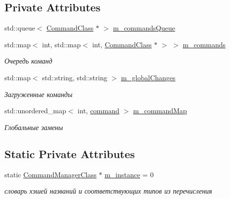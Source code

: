 \subsection*{Private Attributes}
\begin{DoxyCompactItemize}
\item 
std\+::queue$<$ \hyperlink{class_command_class}{Command\+Class} $\ast$ $>$ \hyperlink{class_command_manager_class_ac1a66744c16609dbcd5171adb72049ae}{m\+\_\+commands\+Queue}
\item 
std\+::map$<$ int, std\+::map$<$ int, \hyperlink{class_command_class}{Command\+Class} $\ast$ $>$ $>$ \hyperlink{class_command_manager_class_ad0cbe74a6799e2227e667181f27dc174}{m\+\_\+commands}
\begin{DoxyCompactList}\small\item\em Очередь команд \end{DoxyCompactList}\item 
std\+::map$<$ std\+::string, std\+::string $>$ \hyperlink{class_command_manager_class_a88550817c9f5132113829ee39c04fc71}{m\+\_\+global\+Changes}
\begin{DoxyCompactList}\small\item\em Загруженные команды \end{DoxyCompactList}\item 
std\+::unordered\+\_\+map$<$ int, \hyperlink{class_command_manager_class_aff5b4b6301c24b585b22c6abaf4f3131}{command} $>$ \hyperlink{class_command_manager_class_ab2dddfd7e9dba9913c6cfe5c672d6836}{m\+\_\+command\+Map}
\begin{DoxyCompactList}\small\item\em Глобальные замены \end{DoxyCompactList}\end{DoxyCompactItemize}
\subsection*{Static Private Attributes}
\begin{DoxyCompactItemize}
\item 
static \hyperlink{class_command_manager_class}{Command\+Manager\+Class} $\ast$ \hyperlink{class_command_manager_class_af5d0d5228f22a70bdef9ba0ebb8d20a1}{m\+\_\+instance} = 0
\begin{DoxyCompactList}\small\item\em словарь хэшей названий и соответствующих типов из перечисления \end{DoxyCompactList}\end{DoxyCompactItemize}



